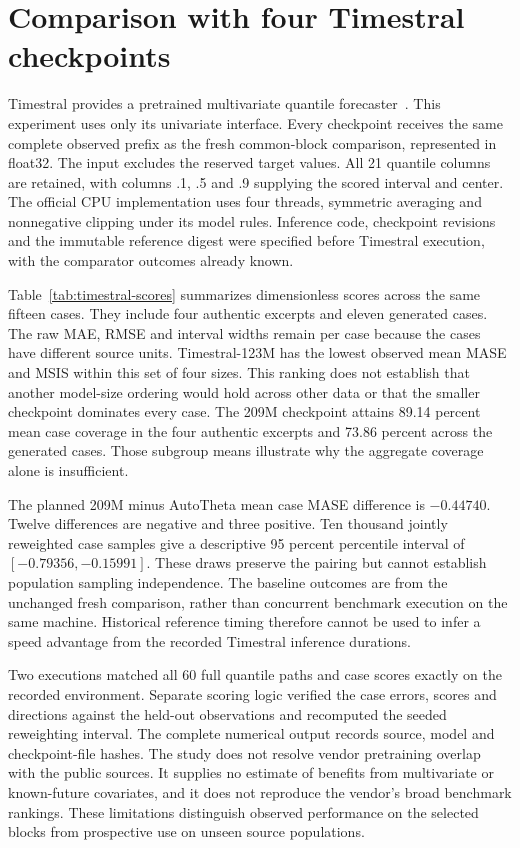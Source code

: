 \section{Comparison with four Timestral checkpoints}
\label{sec:timestral}
Timestral provides a pretrained multivariate quantile forecaster~\cite{timestral}. This experiment uses only its univariate interface. Every checkpoint receives the same complete observed prefix as the fresh common-block comparison, represented in float32. The input excludes the reserved target values. All 21 quantile columns are retained, with columns .1, .5 and .9 supplying the scored interval and center. The official CPU implementation uses four threads, symmetric averaging and nonnegative clipping under its model rules. Inference code, checkpoint revisions and the immutable reference digest were specified before Timestral execution, with the comparator outcomes already known.

Table~\ref{tab:timestral-scores} summarizes dimensionless scores across the same fifteen cases. They include four authentic excerpts and eleven generated cases. The raw MAE, RMSE and interval widths remain per case because the cases have different source units. Timestral-123M has the lowest observed mean MASE and MSIS within this set of four sizes. This ranking does not establish that another model-size ordering would hold across other data or that the smaller checkpoint dominates every case. The 209M checkpoint attains 89.14 percent mean case coverage in the four authentic excerpts and 73.86 percent across the generated cases. Those subgroup means illustrate why the aggregate coverage alone is insufficient.



The planned 209M minus AutoTheta mean case MASE difference is $-0.44740$. Twelve differences are negative and three positive. Ten thousand jointly reweighted case samples give a descriptive 95 percent percentile interval of $[-0.79356,-0.15991]$. These draws preserve the pairing but cannot establish population sampling independence. The baseline outcomes are from the unchanged fresh comparison, rather than concurrent benchmark execution on the same machine. Historical reference timing therefore cannot be used to infer a speed advantage from the recorded Timestral inference durations.

Two executions matched all 60 full quantile paths and case scores exactly on the recorded environment. Separate scoring logic verified the case errors, scores and directions against the held-out observations and recomputed the seeded reweighting interval. The complete numerical output records source, model and checkpoint-file hashes. The study does not resolve vendor pretraining overlap with the public sources. It supplies no estimate of benefits from multivariate or known-future covariates, and it does not reproduce the vendor's broad benchmark rankings. These limitations distinguish observed performance on the selected blocks from prospective use on unseen source populations.
